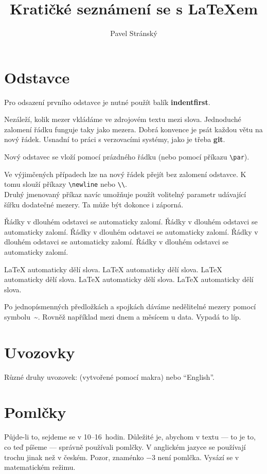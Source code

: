 \documentclass{article}
\author{Pavel Stránský}
\title{Kratičké seznámení se s \LaTeX em}
\def\uv#1{\clqq{#1}\crqq}		%
\begin{document}
	\maketitle					%
	
	\section{Odstavce}
	\label{sec:odstavce}
		Pro odsazení prvního odstavce je nutné použít balík \textbf{indentfirst}.

		Nezáleží,      kolik
		mezer      vkládáme       ve zdrojovém
		textu
		mezi     slova.
		Jednoduché      zalomení   řádku 
		funguje taky      jako
		mezera.
		Dobrá konvence je psát každou větu na nový řádek.
		Usnadní to práci s verzovacími systémy, jako je třeba \textbf{git}.

		Nový odstavec se vloží pomocí prázdného řádku (nebo pomocí příkazu \verb+\par+).
		
		Ve výjimčených případech lze na nový řádek přejít bez zalomení odstavce.
		K tomu slouží příkazy \verb+\newline+ nebo \verb+\\+.
		\\[2px]
		Druhý jmenovaný příkaz navíc umožňuje použít volitelný parametr udávající šířku dodatečné mezery. 
		Ta může být dokonce i záporná.

		Řádky v dlouhém odstavci se automaticky zalomí. 
		Řádky v dlouhém odstavci se automaticky zalomí. 
		Řádky v dlouhém odstavci se automaticky zalomí. 
		Řádky v dlouhém odstavci se automaticky zalomí. 
		Řádky v dlouhém odstavci se automaticky zalomí. 
		
		\LaTeX{} automaticky dělí slova.
		\LaTeX{} automaticky dělí slova.
		\LaTeX{} automaticky dělí slova.
		\LaTeX{} automaticky dělí slova.
		\LaTeX{} automaticky dělí slova.
		
		Po jednopísmenných předložkách a spojkách dáváme nedělitelné mezery pomocí symbolu~\~{}.
		Rovněž například mezi dnem a měsícem u data.
		Vypadá to líp.

	\section{Uvozovky}
		Různé druhy uvozovek: \uv{české} (vytvořené pomocí makra) nebo ``English''.

	\section{Pomlčky}
		Půjde-li to, sejdeme se v 10--16~hodin.
		Důležité je, abychom v textu --- to je to, co teď píšeme --- správně používali pomlčky.
		V anglickém jazyce se používají trochu jinak než v českém.
		Pozor, znaménko $-3$ není pomlčka. 
		Vysází se v matematickém režimu.
\end{document}
